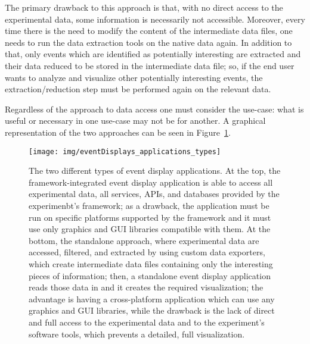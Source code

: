 \documentclass[12pt,a4paper]{article}
\begin{document}
The primary drawback to this approach is that, with no direct access to the experimental data, some
information is necessarily not accessible. Moreover, every time there is the need to modify the content of the
intermediate data files, one needs to run the data extraction tools on the native data again.
In addition to that, only events which are identified as potentially interesting are extracted and their
data reduced to be stored in the intermediate data file; so, if the end user wants to analyze and visualize other
potentially interesting events, the extraction/reduction step must be performed again on the relevant data.

Regardless of the approach to data access one must consider the use-case: what is useful or necessary
in one use-case may not be for another. A graphical representation of the two approaches can be
seen in Figure~\ref{fig:eventdisplaysapplicationstypes}.

\begin{figure}
	\centering
	\texttt{[image: img/eventDisplays\_applications\_types]}
	\caption[Different types of event display applications]{The two different types of event display applications. At the top,
	the framework-integrated event display application is able to access all experimental data, all services, APIs, and databases
	provided by the experimenbt's framework; as a drawback, the application must be run on specific platforms supported by the
	framework and it must use only graphics and GUI libraries compatible with them. At the bottom, the standalone approach, where
	experimental data are accessed, filtered, and extracted by using custom data exporters, which create intermediate data files
	containing only the interesting pieces of information; then, a standalone event display application reads those data in and it
	creates the required visualization; the advantage is having a cross-platform application which can use any graphics and GUI libraries,
	while the drawback is the lack of direct and full access to the experimental data and to the experiment's software tools,
	which prevents a detailed, full visualization.}
	\label{fig:eventdisplaysapplicationstypes}
\end{figure}

\end{document}
